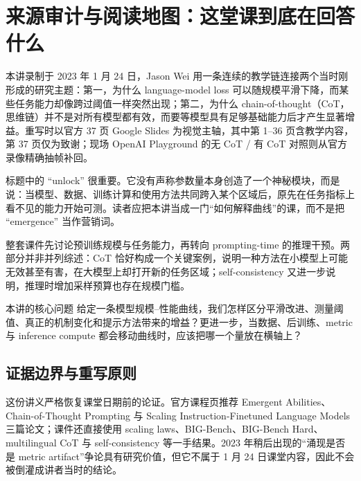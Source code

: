\section{来源审计与阅读地图：这堂课到底在回答什么}

本讲录制于 2023 年 1 月 24 日，Jason Wei 用一条连续的教学链连接两个当时刚形成的研究主题：第一，为什么 language-model loss 可以随规模平滑下降，而某些任务能力却像跨过阈值一样突然出现；第二，为什么 chain-of-thought（CoT，思维链）并不是对所有模型都有效，而要等模型具有足够基础能力后才产生显著增益。重写时以官方 37 页 Google Slides 为视觉主轴，其中第 1--36 页含教学内容，第 37 页仅为致谢；现场 OpenAI Playground 的无 CoT / 有 CoT 对照则从官方录像精确抽帧补回。


标题中的 ``unlock'' 很重要。它没有声称参数量本身创造了一个神秘模块，而是说：当模型、数据、训练计算和使用方法共同跨入某个区域后，原先在任务指标上看不见的能力开始可测。读者应把本讲当成一门“如何解释曲线”的课，而不是把 ``emergence'' 当作营销词。


整套课件先讨论预训练规模与任务能力，再转向 prompting-time 的推理干预。两部分并非并列综述：CoT 恰好构成一个关键案例，说明一种方法在小模型上可能无效甚至有害，在大模型上却打开新的任务区域；self-consistency 又进一步说明，推理时增加采样预算也存在规模门槛。

\begin{importantbox}{本讲的核心问题}
给定一条模型规模--性能曲线，我们怎样区分平滑改进、测量阈值、真正的机制变化和提示方法带来的增益？更进一步，当数据、后训练、metric 与 inference compute 都会移动曲线时，应该把哪一个量放在横轴上？
\end{importantbox}


\subsection{证据边界与重写原则}

这份讲义严格恢复课堂日期前的论证。官方课程页推荐 Emergent Abilities、Chain-of-Thought Prompting 与 Scaling Instruction-Finetuned Language Models 三篇论文；课件还直接使用 scaling laws、BIG-Bench、BIG-Bench Hard、multilingual CoT 与 self-consistency 等一手结果。2023 年稍后出现的“涌现是否是 metric artifact”争论具有研究价值，但它不属于 1 月 24 日课堂内容，因此不会被倒灌成讲者当时的结论。

